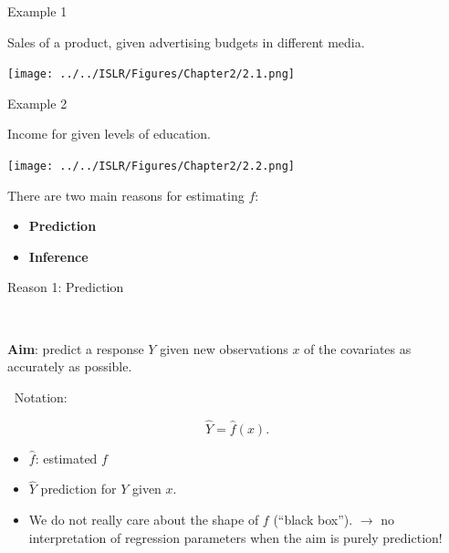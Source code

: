 \documentclass[ignorenonframetext,]{beamer}
\begin{document}
\begin{frame}{Example 1}

Sales of a product, given advertising budgets in different media.

\texttt{[image: ../../ISLR/Figures/Chapter2/2.1.png]}

\end{frame}

\begin{frame}{Example 2}

\vspace{2mm} Income for given levels of education.

\texttt{[image: ../../ISLR/Figures/Chapter2/2.2.png]}

\end{frame}

\begin{frame}

There are two main reasons for estimating \(f\):

\begin{itemize}
\item
  \textbf{Prediction}
\item
  \textbf{Inference}
\end{itemize}

\end{frame}

\begin{frame}

\begin{block}{Reason 1: Prediction}

\(~\)

\textbf{Aim}: predict a response \(Y\) given new observations \(x\) of
the covariates as accurately as possible.

\(~\) Notation:

\[\hat{Y} = \hat{f}(x).\]

\begin{itemize}
\item
  \(\hat{f}\): estimated \(f\)
\item
  \(\hat{Y}\) prediction for \(Y\) given \(x\).
\item
  We do not really care about the shape of \(f\) (``black box'').
  \(\rightarrow\) no interpretation of regression parameters when the
  aim is purely prediction!
\end{itemize}

\end{block}

\end{frame}
\end{document}
